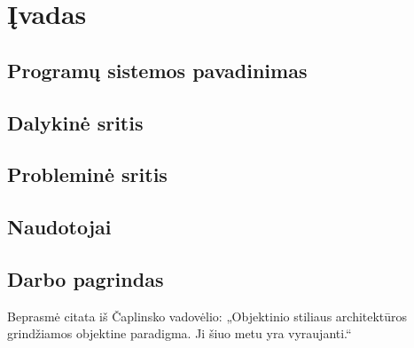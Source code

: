 \chapter{Įvadas}


\section{Programų sistemos pavadinimas}

\section{Dalykinė sritis}

\section{Probleminė sritis}

\section{Naudotojai}

\section{Darbo pagrindas}

Beprasmė citata iš Čaplinsko vadovėlio: „Objektinio stiliaus architektūros
grindžiamos objektine paradigma. Ji šiuo metu yra 
vyraujanti.“\cite[50]{cap_psi2}

